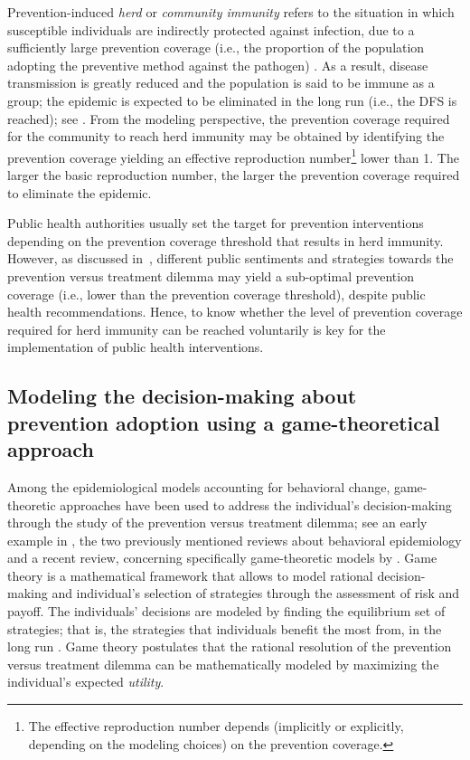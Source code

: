 Prevention-induced \textit{herd} or \textit{community immunity} refers to the situation in which susceptible individuals are indirectly protected against infection, due to a sufficiently large prevention coverage (i.e., the proportion of the population adopting the preventive method against the pathogen) \cite[]{Porta2014}. As a result, disease transmission is greatly reduced and the population is said to be immune as a group; the epidemic is expected to be eliminated in the long run (i.e., the DFS is reached); see \cite{Fine2011}. From the modeling perspective, the prevention coverage required for the community to reach herd immunity may be obtained by identifying the prevention coverage yielding an effective reproduction number\footnote{The effective reproduction number depends (implicitly or explicitly, depending on the modeling choices) on the prevention coverage.} lower than 1. The larger the basic reproduction number, the larger the prevention coverage required to eliminate the epidemic. 

Public health authorities usually set the target for prevention interventions depending on the prevention coverage threshold that results in herd immunity. However, as discussed in~, different public sentiments and strategies towards the prevention versus treatment dilemma may yield a sub-optimal prevention coverage (i.e., lower than the prevention coverage threshold), despite public health recommendations. Hence, to know whether the level of prevention coverage required for herd immunity can be reached voluntarily is key for the implementation of public health interventions. 


\subsection{Modeling the decision-making about prevention adoption using a game-theoretical approach}
\label{Intro:DecisionModel}

Among the epidemiological models accounting for behavioral change, game-theoretic approaches have been used to address the individual's decision-making through the study of the prevention versus treatment dilemma; see an early example in \cite{Bauch2013}, the two previously mentioned reviews about behavioral epidemiology \cite[]{Verelst2016,Wang2016} and a recent review, concerning specifically game-theoretic models by \cite{Chang2020}. Game theory is a mathematical framework that allows to model rational decision-making and individual's selection of strategies through the assessment of risk and payoff. The individuals' decisions are modeled by finding the equilibrium set of strategies; that is, the strategies that individuals benefit the most from, in the long run \cite[]{Manfredi2013}. Game theory postulates that the rational resolution of the prevention versus treatment dilemma can be mathematically modeled by maximizing the individual's expected {\it utility}. 

